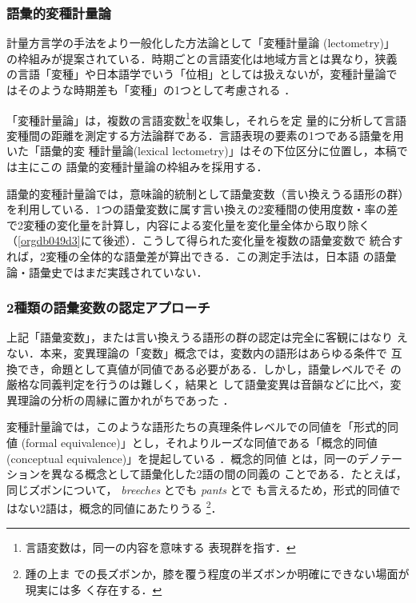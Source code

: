 \documentclass[submit]{ipsj}
\renewcommand{\ref}{\cref}
\begin{document}
\subsubsection{語彙的変種計量論\label{org1542c0f}}
\label{sec:org6399864}
計量方言学の手法をより一般化した方法論として「変種計量論 (lectometry)」
の枠組みが提案されている．時期ごとの言語変化は地域方言とは異なり，狭義
の言語「変種」や日本語学でいう「位相」としては扱えないが，変種計量論で
はそのような時期差も「変種」の1つとして考慮される
\cite{Geeraerts2023Lexical}．

「変種計量論」は，複数の言語変数\footnote{言語変数は，同一の内容を意味する
表現群を指す\cite{Labov1972Sociolinguistic}．}を収集し，それらを定
量的に分析して言語変種間の距離を測定する方法論群である\cite{Ruette2014Semantic}．言語表現の要素の1つである語彙を用いた「語彙的変
種計量論(lexical lectometry)」はその下位区分に位置し，本稿では主にこの
語彙的変種計量論の枠組みを採用する．

語彙的変種計量論では，意味論的統制として語彙変数（言い換えうる語形の群）
を利用している．1つの語彙変数に属す言い換えの2変種間の使用度数・率の差
で2変種の変化量を計算し，内容による変化量を変化量全体から取り除く
（\ref{orgdb049d3}にて後述）．こうして得られた変化量を複数の語彙変数で
統合すれば，2変種の全体的な語彙差が算出できる．この測定手法は，日本語
の語彙論・語彙史ではまだ実践されていない．
\subsubsection{2種類の語彙変数の認定アプローチ}
\label{sec:org8a4805f}
上記「語彙変数」，または言い換えうる語形の群の認定は完全に客観にはなり
えない．本来，変異理論の「変数」概念では，変数内の語形はあらゆる条件で
互換でき，命題として真値が同値である必要がある．しかし，語彙レベルでそ
の厳格な同義判定を行うのは難しく\cite{Lavandera1978Where}，結果と
して語彙変異は音韻などに比べ，変異理論の分析の周縁に置かれがちであった
\cite{DePascale2019Tokenbased}．

変種計量論では，このような語形たちの真理条件レベルでの同値を「形式的同
値 (formal equivalence)」とし，それよりルーズな同値である「概念的同値
(conceptual equivalence)」を提起している
\cite{Geeraerts2023Lexical,DePascale2019Tokenbased}．概念的同値
とは，同一のデノテーションを異なる概念として語彙化した2語の間の同義の
ことである．たとえば，同じズボンについて， \emph{breeches} とでも \emph{pants} とで
も言えるため，形式的同値ではない2語は，概念的同値にあたりうる
\cite{DePascale2019Tokenbased,Geeraerts2023Lexical}\footnote{踵の上ま
での長ズボンか，膝を覆う程度の半ズボンか明確にできない場面が現実には多
く存在する．}．
\end{document}
